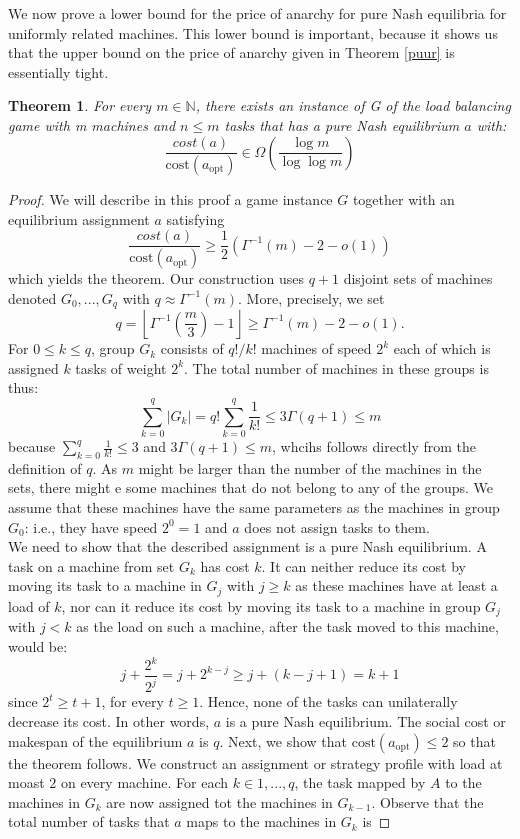 \documentclass[a4paper,11pt]{article}
\newtheorem{theorem}{Theorem}[section]
\newcommand{\N}{{\mathbb N}}
\newcommand{\cost}{\text{cost}}
\newcommand{\opt}{\text{opt}}
\newcommand{\copt}{\cost(a_{\opt})}
\begin{document}
We now prove a lower bound for the price of anarchy for pure Nash equilibria for uniformly related machines. This lower bound is important, because it shows us that the upper bound on the price of anarchy given in Theorem \ref{puur} is essentially tight.

\begin{theorem}\label{puur2}
For every $m \in \N$, there exists an instance of G of the load balancing game with m machines and $n \leq m$ tasks that has a pure Nash equilibrium $a$ with:
$$\frac{cost(a)}{\cost(a_{\opt})} \in \Omega\left(\frac{\log m}{\log \log m}\right)$$
\end{theorem}
\begin{proof}
We will describe in this proof a game instance $G$ together with an equilibrium assignment $a$ satisfying
$$\frac{cost(a)}{\cost(a_{\opt})} \geq \frac{1}{2} \left(\Gamma^{-1}(m) - 2 - o(1)\right)$$
which yields the theorem.
Our construction uses $q+1$ disjoint sets of machines denoted $G_0,...,G_q$ with $q \approx \Gamma^{-1}(m)$. More, precisely, we set
$$ q = \left\lfloor \Gamma^{-1}(\frac{m}{3}) - 1 \right\rfloor \geq \Gamma^{-1}(m)-2-o(1).$$
For $0 \leq k \leq q$, group $G_k$ consists of $q!/k!$ machines of speed $2^k$ each of which is assigned $k$ tasks of weight $2^k$. The total number of machines in these groups is thus:
$$\displaystyle\sum_{k=0}^{q} |G_k| = q! \displaystyle\sum_{k=0}^{q}\frac{1}{k!}\leq 3\Gamma(q+1) \leq m$$
because $\sum_{k=0}^{q}\frac{1}{k!} \leq 3$ and $3\Gamma(q+1)\leq m$, whcihs follows directly from the definition of $q$. As $m$ might be larger than the number of the machines in the sets, there might e some machines that do not belong to any of the groups. We assume that these machines have the same parameters as the machines in group $G_0$: i.e., they have speed $2^0=1$ and $a$ does not assign tasks to them.\\
We need to show that the described assignment is a pure Nash equilibrium. A task on a machine from set $G_k$ has cost $k$. It can neither reduce its cost by moving its task to a machine in $G_j$ with $j\geq k$ as these machines have at least a load of $k$, nor can it reduce its cost by moving its task to a machine in group $G_j$ with $j < k$ as the load on such a machine, after the task moved to this machine, would be:
$$j + \frac{2^k}{2^j} = j + 2^{k-j} \geq j + (k - j + 1) = k + 1$$
since $2^t \geq t + 1$, for every $t\geq 1$. Hence, none of the tasks can unilaterally decrease its cost. In other words, $a$ is a pure Nash equilibrium.
The social cost or makespan of the equilibrium $a$ is $q$. Next, we show that $\copt \leq 2$ so that the theorem follows. We construct an assignment or strategy profile with load at moast $2$ on every machine. For each $k \in {1,...,q}$, the task mapped by $A$ to the machines in $G_k$ are now assigned tot the machines in $G_{k-1}$. Observe that the total number of tasks that $a$ maps to the machines in $G_k$ is

\end{proof}
\end{document}
